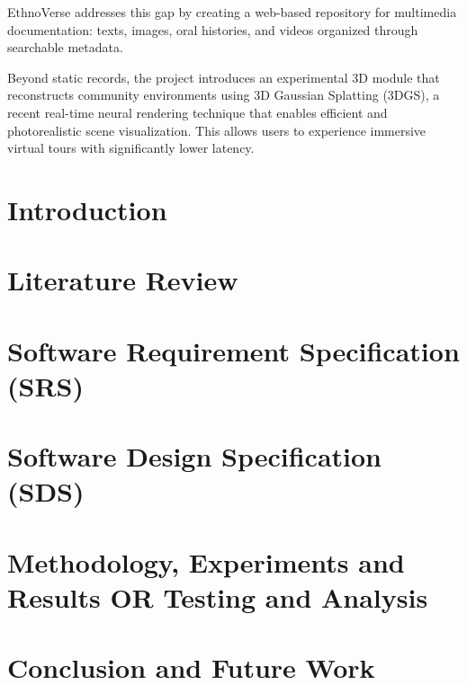 \documentclass[12pt,twosided]{report}
\begin{document}
EthnoVerse addresses this gap by creating a web-based repository for multimedia documentation: texts, images, oral histories, and videos organized through searchable metadata.

Beyond static records, the project introduces an experimental 3D module that reconstructs community environments using 3D Gaussian Splatting (3DGS), a recent real-time neural rendering technique that enables efficient and photorealistic scene visualization. This allows users to experience immersive virtual tours with significantly lower latency.


\tableofcontents
\listoffigures
\listoftables

\chapter{Introduction}
\label{chap:intro}


\chapter{Literature Review}
\label{chap:lit}


\chapter{Software Requirement Specification (SRS)}
\label{chap:srs}


\chapter{Software Design Specification (SDS)}
\label{chap:sds}


\chapter{Methodology, Experiments and Results OR Testing and Analysis}
\label{chap:results}


\chapter{Conclusion and Future Work}
\label{chap:outro}

\end{document}
